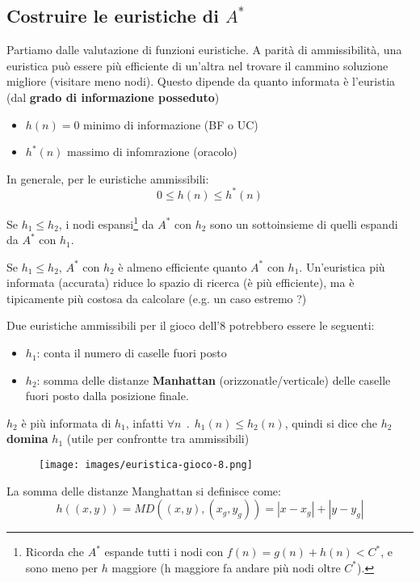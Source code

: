\subsection{Costruire le euristiche di $A^*$}
Partiamo dalle valutazione di funzioni euristiche. A parità di ammissibilità, una euristica può essere più
efficiente di un’altra nel trovare il cammino soluzione migliore (visitare meno nodi). Questo dipende da quanto
informata è l'euristia (dal \textbf{grado di informazione posseduto}) 
\begin{itemize}
    \item $h(n) = 0$ minimo di informazione (BF o UC)
    \item $h^*(n)$ massimo di infomrazione (oracolo)
\end{itemize}
In generale, per le euristiche ammissibili:
$$0 \leq h(n) \leq h^*(n)$$
\begin{theorem}
    Se $h_1 \leq h_2$, i nodi espansi\footnote{Ricorda che $A^*$ espande tutti i nodi con $f(n) = g(n) + h(n) < C^*$, e sono meno per $h$ maggiore (h maggiore fa andare più nodi oltre $C^*$).} da $A^*$ con $h_2$ sono un sottoinsieme di quelli espandi da $A^*$ con $h_1$.
\end{theorem}
\hspace{-15pt}Se $h_1 \leq h_2$, $A^*$ con $h_2$ è almeno efficiente quanto $A^*$ con $h_1$.
Un’euristica più informata (accurata) riduce lo spazio di ricerca (è più efficiente), ma è tipicamente più costosa da calcolare (e.g. un caso estremo ?)
\begin{example}
    Due euristiche ammissibili per il gioco dell'8 potrebbero essere le seguenti:
    \begin{itemize}
        \item $h_1$: conta il numero di caselle fuori posto
        \item $h_2$: somma delle distanze \textbf{Manhattan} (orizzonatle/verticale) delle caselle fuori posto dalla posizione finale.
    \end{itemize}
    $h_2$ è più informata di $h_1$, infatti $\forall n \:\:.\:\: h_1(n) \leq h_2(n)$, quindi si dice che $h_2$ \textbf{domina} $h_1$ (utile per confrontte tra ammissibili)
    \begin{figure}[h!]
        \centering
        \texttt{[image: images/euristica-gioco-8.png]}
    \end{figure}
\end{example}
\begin{definition}
    La somma delle distanze Manghattan si definisce come:
    $$h((x,y)) = MD((x,y), (x_g, y_g)) = |x - x_g| + |y - y_g|$$
\end{definition}
